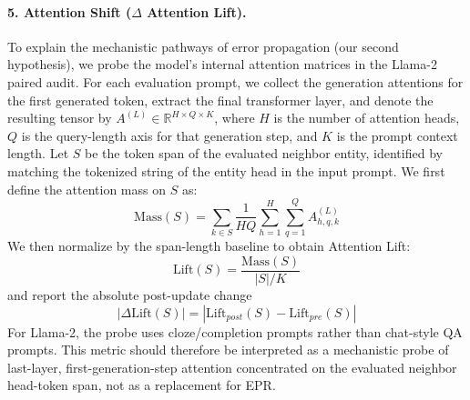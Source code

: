 \paragraph{5. Attention Shift ($\Delta$ Attention Lift).}
To explain the mechanistic pathways of error propagation (our second hypothesis), we probe the model's internal attention matrices in the Llama-2 paired audit. For each evaluation prompt, we collect the generation attentions for the first generated token, extract the final transformer layer, and denote the resulting tensor by $A^{(L)} \in \mathbb{R}^{H \times Q \times K}$, where $H$ is the number of attention heads, $Q$ is the query-length axis for that generation step, and $K$ is the prompt context length. Let $S$ be the token span of the evaluated neighbor entity, identified by matching the tokenized string of the entity head in the input prompt. We first define the attention mass on $S$ as:
\begin{equation}
\mathrm{Mass}(S) = \sum_{k \in S} \frac{1}{HQ} \sum_{h=1}^{H} \sum_{q=1}^{Q} A^{(L)}_{h,q,k}
\end{equation}
We then normalize by the span-length baseline to obtain Attention Lift:
\begin{equation}
\mathrm{Lift}(S) = \frac{\mathrm{Mass}(S)}{|S|/K}
\end{equation}
and report the absolute post-update change
\begin{equation}
|\Delta \mathrm{Lift}(S)| = |\mathrm{Lift}_{post}(S) - \mathrm{Lift}_{pre}(S)|
\end{equation}
For Llama-2, the probe uses cloze/completion prompts rather than chat-style QA prompts. This metric should therefore be interpreted as a mechanistic probe of last-layer, first-generation-step attention concentrated on the evaluated neighbor head-token span, not as a replacement for EPR.